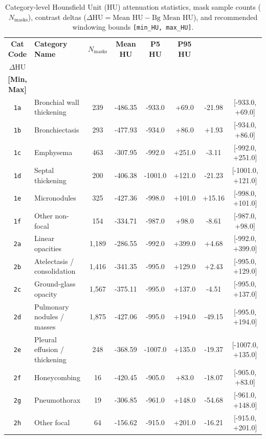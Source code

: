 \documentclass[11pt,a4paper]{article}
\begin{document}
\begin{table}[htbp]
\centering
\caption{Category-level Hounsfield Unit (HU) attenuation statistics, mask sample counts ($N_{\text{masks}}$), contrast deltas ($\Delta \text{HU} = \text{Mean HU} - \text{Bg Mean HU}$), and recommended windowing bounds \texttt{[min\_HU, max\_HU]}.}
\label{tab:hu_stats}
\footnotesize
\setlength{\tabcolsep}{3.5pt}
\begin{tabularx}{\linewidth}{c >{\raggedright\arraybackslash}X c c c c c c}
\toprule
\textbf{Cat Code} & \textbf{Category Name} & \textbf{$N_{\text{masks}}$} & \textbf{Mean HU} & \textbf{P5 HU} & \textbf{P95 HU} & \makecell{\textbf{Contrast}\\\textbf{$\Delta\text{HU}$}} & \makecell{\textbf{Rec Window}\\\textbf{[Min, Max]}} \\
\midrule
\texttt{1a} & Bronchial wall thickening & 239 & -486.35 & -933.0 & +69.0 & -21.98 & [-933.0, +69.0] \\
\texttt{1b} & Bronchiectasis & 293 & -477.93 & -934.0 & +86.0 & +1.93 & [-934.0, +86.0] \\
\texttt{1c} & Emphysema & 463 & -307.95 & -992.0 & +251.0 & -3.11 & [-992.0, +251.0] \\
\texttt{1d} & Septal thickening & 200 & -406.38 & -1001.0 & +121.0 & -21.23 & [-1001.0, +121.0] \\
\texttt{1e} & Micronodules & 325 & -427.36 & -998.0 & +101.0 & +15.16 & [-998.0, +101.0] \\
\texttt{1f} & Other non-focal & 154 & -334.71 & -987.0 & +98.0 & -8.61 & [-987.0, +98.0] \\
\texttt{2a} & Linear opacities & 1,189 & -286.55 & -992.0 & +399.0 & +4.68 & [-992.0, +399.0] \\
\texttt{2b} & Atelectasis / consolidation & 1,416 & -341.35 & -995.0 & +129.0 & +2.43 & [-995.0, +129.0] \\
\texttt{2c} & Ground-glass opacity & 1,567 & -375.11 & -995.0 & +137.0 & -4.51 & [-995.0, +137.0] \\
\texttt{2d} & Pulmonary nodules / masses & 1,875 & -427.06 & -995.0 & +194.0 & -49.15 & [-995.0, +194.0] \\
\texttt{2e} & Pleural effusion / thickening & 248 & -368.59 & -1007.0 & +135.0 & -19.37 & [-1007.0, +135.0] \\
\texttt{2f} & Honeycombing & 16 & -420.45 & -905.0 & +83.0 & -18.07 & [-905.0, +83.0] \\
\texttt{2g} & Pneumothorax & 19 & -306.85 & -961.0 & +148.0 & -54.68 & [-961.0, +148.0] \\
\texttt{2h} & Other focal & 64 & -156.62 & -915.0 & +201.0 & -16.21 & [-915.0, +201.0] \\
\bottomrule
\end{tabularx}
\end{table}
\end{document}
